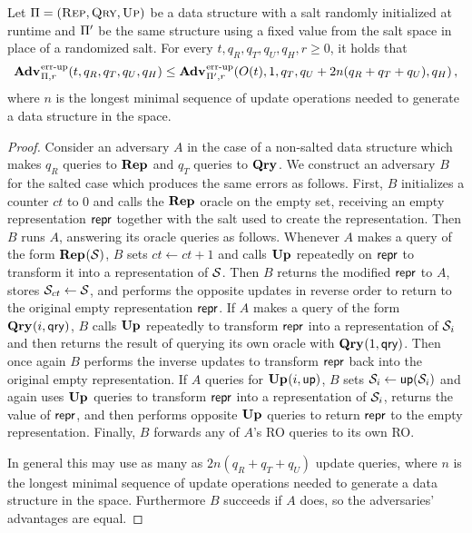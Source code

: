  
\begin{lemma}\label{lemma:noinvsalt}
  Let $\mathrm{\Pi} = (\textsc{Rep}, \textsc{Qry}, \textsc{Up})$ be a data structure with a salt randomly initialized at runtime and $\mathrm{\Pi}'$ be the same structure using a fixed value from the salt space in place of a randomized salt. For every $t, q_R, q_T, q_U, q_H, r\geq 0$, it holds that
  \[
    \Adv{\errep}_{\struct,r}(t, q_R, q_T, q_U, q_H) \leq
    \Adv{\errep}_{\struct',r}(O(t), 1, q_T, q_U+2n(q_R+q_T+q_U), q_H) \,,
  \]
  where $n$ is the longest minimal sequence of update operations needed to generate a data structure in the space.
\end{lemma}
\begin{proof}
Consider an adversary $A$ in the case of a non-salted data structure which makes $q_R$ queries to $\mathbf{Rep}\hspace{0.5pt}$ and $q_T$ queries to $\mathbf{Qry}\hspace{0.5pt}$. We construct an adversary $B$ for the salted case which produces the same errors as follows. First, $B$ initializes a counter $ct$ to 0 and calls the $\mathbf{Rep}\hspace{0.5pt}$ oracle on the empty set, receiving an empty representation $\mathsf{repr}$ together with the salt used to create the representation. Then $B$ runs $A$, answering its oracle queries as follows. Whenever $A$ makes a query of the form $\mathbf{Rep}\hspace{0.5pt}(\mathcal{S})$, $B$ sets $ct \gets ct + 1$ and calls $\mathbf{Up}\hspace{0.5pt}$ repeatedly on $\mathsf{repr}$ to transform it into a representation of $\mathcal{S}$. Then $B$ returns the modified $\mathsf{repr}$ to $A$, stores $\mathcal{S}_{ct} \gets \mathcal{S}$, and performs the opposite updates in reverse order to return to the original empty representation $\mathsf{repr}$. If $A$ makes a query of the form $\mathbf{Qry}\hspace{0.5pt}(i,\mathsf{qry})$, $B$ calls $\mathbf{Up}\hspace{0.5pt}$ repeatedly to transform $\mathsf{repr}$ into a representation of $\mathcal{S}_i$ and then returns the result of querying its own oracle with $\mathbf{Qry}\hspace{0.5pt}(1, \mathsf{qry})$. Then once again $B$ performs the inverse updates to transform $\mathsf{repr}$ back into the original empty representation. If $A$ queries for $\mathbf{Up}\hspace{0.5pt}(i, \mathsf{up})$, $B$ sets $\mathcal{S}_i \gets \mathsf{up}(\mathcal{S}_i)$ and again uses $\mathbf{Up}\hspace{0.5pt}$ queries to transform $\mathsf{repr}$ into a representation of $\mathcal{S}_i$, returns the value of $\mathsf{repr}$, and then performs opposite $\mathbf{Up}\hspace{0.5pt}$ queries to return $\mathsf{repr}$ to the empty representation. Finally, $B$ forwards any of $A$'s RO queries to its own RO.

In general this may use as many as $2n(q_R+q_T+q_U)$ update queries, where $n$ is the longest minimal sequence of update operations needed to generate a data structure in the space. Furthermore $B$ succeeds if $A$ does, so the adversaries' advantages are equal.\missingqed
\end{proof}

